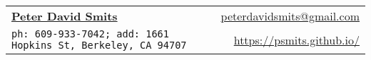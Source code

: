 \documentclass[letterpaper,11pt]{article}
\newcommand{\resheading}[1]{{\large \colorbox{mygrey}{\begin{minipage}{\textwidth}{\textbf{#1 \vphantom{p\^{E}}}}\end{minipage}}}}
\begin{document}
\newcommand{\mywebheader}{
  \begin{tabular*}{7in}{l@{\extracolsep{\fill}}r}
    \textbf{\href{https://psmits.github.io/}{\LARGE Peter David Smits}} & \href{mailto:peterdavidsmits@gmail.com}{peterdavidsmits@gmail.com}\\
    {\footnotesize \texttt{ph: 609-933-7042; add: 1661 Hopkins St, Berkeley, CA 94707}} & \href{https://psmits.github.io/}{https://psmits.github.io/} \\
  \end{tabular*}
  \\
\vspace{0.1in}}

\mywebheader

\end{document}
